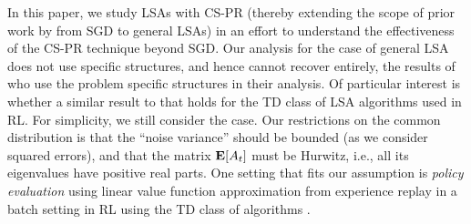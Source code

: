 In this paper, we study LSAs with CS-PR (thereby extending the scope of prior work by \citet{bach} from SGD to general LSAs) 
in an effort to understand the effectiveness of the CS-PR technique beyond SGD. Our analysis for the case of general LSA does not use specific structures, and hence cannot recover entirely, the results of \citet{bach} who use the problem specific structures in their analysis.
Of particular interest is whether a similar result to that  \citet{bach} holds
for the TD class of LSA algorithms used in RL.
For simplicity, we still consider the \iid case. Our restrictions on the common distribution is that the ``noise variance'' should be bounded (as we consider squared errors), and that the matrix $\mathbf{E}[A_t]$ must be Hurwitz, i.e., all its eigenvalues have positive real parts. %
One setting that fits our assumption is \emph{policy evaluation} \cite{dann} using linear value function approximation from experience replay \cite{lin} in a batch setting \cite{lange} in RL using the TD class of algorithms \cite{sutton,konda-tsitsiklis,gtd,gtd2,gtdmp}. 

